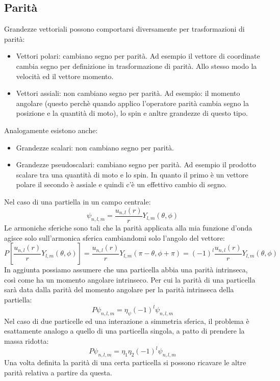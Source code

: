 \subsection{Parità}
Grandezze vettoriali possono comportarsi diversamente per trasformazioni di parità:
\begin{itemize}
    \item Vettori polari: cambiano segno per parità. Ad esempio il vettore di coordinate cambia segno per definizione in trasformazione di parità. Allo stesso modo la velocità ed il vettore momento.
    \item Vettori assiali: non cambiano segno per parità. Ad esempio: il momento angolare (questo perchè quando applico l'operatore parità cambia segno la posizione e la quantità di moto), lo spin e anltre grandezze di questo tipo.
\end{itemize}
Analogamente esistono anche:
\begin{itemize}
    \item Grandezze scalari: non cambiano segno per parità.
    \item Grandezze pseudoscalari: cambiano segno per parità. Ad esempio il prodotto scalare tra una quantità di moto e lo spin. In quanto il primo è un vettore polare il secondo è assiale e quindi c'è un effettivo cambio di segno.
\end{itemize}
Nel caso di una partiella in un campo centrale:
\begin{equation*}
    \psi_{n,l,m}=\frac{u_{n,l}(r)}{r}Y_{l,m}(\theta, \phi)
\end{equation*}
Le armoniche sferiche sono tali che la parità applicata alla mia funzione d'onda agisce solo sull'armonica sferica cambiandomi solo l'angolo del vettore:
\begin{equation*}
    P\left[\frac{u_{n,l}(r)}{r}Y_{l,m}(\theta,\phi)\right]=\frac{u_{n,l}(r)}{r}Y_{l,m}(\pi-\theta, \phi+\pi)=(-1)^l\frac{u_{n,l}(r)}{r}Y_{l,m}(\theta,\phi)
\end{equation*}
In aggiunta possiamo assumere che una particella abbia una parità intrinseca, così come ha un momento angolare intrinseco. Per cui la parità di una particella sarà data dalla parità del momento angolare per la parità intrinseca della partiella:
\begin{equation*}
    P\psi_{n,l,m}=\eta_\psi(-1)^l\psi_{n,l,m}
\end{equation*}
Nel caso di due particelle ed una interazione a simmetria sferica, il problema è esattamente analogo a quello di una particella singola, a patto di prendere la massa ridotta:
\begin{equation*}
    P\psi_{n,l,m}=\eta_1\eta_2(-1)^l\psi_{n,l,m}
\end{equation*}
Una volta definita la parità di una certa particella si possono ricavare le altre parità relativa a partire da questa. 
